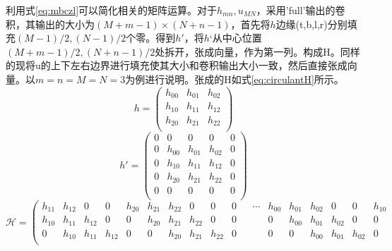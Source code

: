 \documentclass[UTF8]{ctexart}
\begin{document}
\begin{sloppypar}
        利用式\eqref{eq:mbczl}可以简化相关的矩阵运算。对于$h_{mn},u_{MN}$，采用'full'输出的卷积，其输出的大小为$(M+m-1)\times(N+n-1)$，首先将$h$边缘(t,b,l,r)分别填充$(M-1)/2,(N-1)/2$个零。得到$h'$，将$h‘$从中心位置$(M+m-1)/2,(N+n-1)/2$处拆开，张成向量，作为第一列。构成H。同样的现将u的上下左右边界进行填充使其大小和卷积输出大小一致，然后直接张成向量。以$m=n=M=N=3$为例进行说明。张成的H如式\eqref{eq:circulantH}所示。
        \begin{equation}
            h = \begin{pmatrix}
                       h_{00} & h_{01} & h_{02} \\
                       h_{10} & h_{11} & h_{12} \\
                       h_{20} & h_{21} & h_{22} \\
            \end{pmatrix}
        \end{equation}
        \begin{equation}
            h' = \begin{pmatrix}
                           0&    0     &    0   &  0     &  0 \\
                           0&   h_{00} & h_{01} & h_{02} &  0\\
                           0&   h_{10} & h_{11} & h_{12} &  0\\
                           0&   h_{20} & h_{21} & h_{22} &  0\\
                           0&    0     &    0   &  0     &  0 \\
            \end{pmatrix}
        \end{equation}
        \begin{equation}
            \mathcal{H}= \left(   \begin{array}{ccccc|ccccc|ccc|ccccc}
                              h_{11}&   h_{12} &    0   &  0     &  h_{20} &  h_{21} & h_{22} &   0    &   0     &    0   &        & \cdots & h_{00} & h_{01} & h_{02} & 0      & 0      & h_{10}\\
                              h_{10}&   h_{11} & h_{12} &  0     &  0      &  h_{20} & h_{21} & h_{22} &   0     &    0   &        &        &    0   & h_{00} & h_{01} & h_{02} & 0      & 0  \\
                              0&        h_{10} & h_{11} & h_{12} &  0      &   0     & h_{20} & h_{21} & h_{22}  &    0   &        &        &    0   &   0    & h_{00} & h_{01} & h_{02} & 0  \\

\end{array}
\end{equation}
\end{sloppypar}
\end{document}
